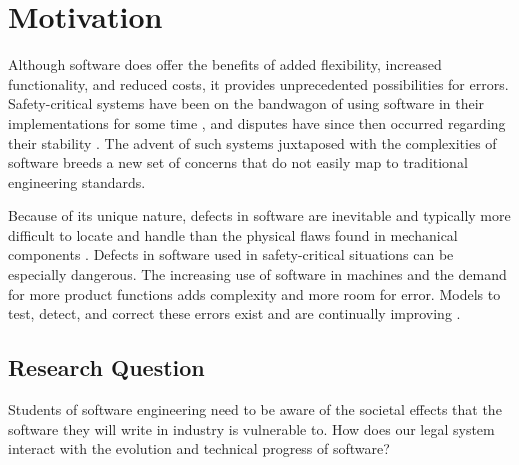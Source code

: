 \chapter{Motivation}

Although software does offer the benefits of added flexibility, increased
functionality, and reduced costs, it provides unprecedented possibilities for
errors. Safety-critical systems have been on the bandwagon of using software in
their implementations for some time \cite{Graupe78,Hurtig94}, and disputes have
since then occurred regarding their stability \cite{Therac25,Maisel05}. The 
advent of such systems juxtaposed with the complexities of software breeds a new
set of concerns that do not easily map to traditional engineering standards.

Because of its unique nature, defects in software are inevitable and typically
more difficult to locate and handle than the physical flaws found in mechanical
components \cite{Parnas90}. Defects in software used in safety-critical
situations can be especially dangerous. The increasing use of software in
machines and the demand for more product functions adds complexity and more room
for error. Models to test, detect, and correct these errors exist and are
continually improving \cite{Parnas90}.

\section{Research Question}

Students of software engineering need to be aware of the societal effects that
the software they will write in industry is vulnerable to. How does our legal
system interact with the evolution and technical progress of software?
